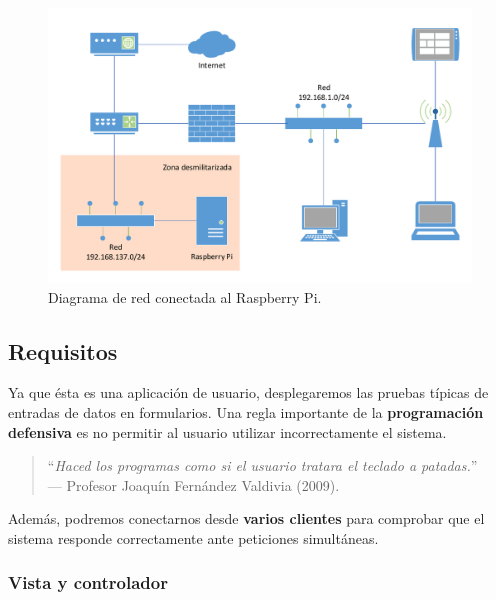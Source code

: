 \begin{figure}[H]
	\noindent \begin{centering}
		\includegraphics[width=\linewidth*3/4]{capitulo6/network}
		\par\end{centering}
	\smallskip
	\caption{\label{fig:network} Diagrama de red conectada al Raspberry Pi.}
\end{figure}

\smallskip

\subsection{Requisitos}

Ya que ésta es una aplicación de usuario, desplegaremos las pruebas típicas de entradas de datos en formularios. Una regla importante de la \textbf{programación defensiva} es no permitir al usuario utilizar incorrectamente el sistema.

\bigskip

\begin{quote}
	\small \flushright ``\textit{Haced los programas como si el usuario tratara el teclado a patadas.}'' \\
	--- Profesor Joaquín Fernández Valdivia (2009).
\end{quote}

\bigskip

Además, podremos conectarnos desde \textbf{varios clientes} para comprobar que el sistema responde correctamente ante peticiones simultáneas.

\subsubsection{Vista y controlador}

